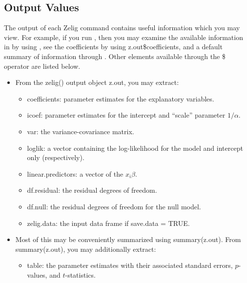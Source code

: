 \documentclass[letterpaper,10pt,english]{sphinxmanual}
\begin{document}
\subsection{Output Values}
\label{vignette:id74}
The output of each Zelig command contains useful information which you
may view. For example, if you run
, then you may examine
the available information in  by using , see
the coefficients by using z.out\$coefficients, and a default summary of
information through . Other elements available through
the \$ operator are listed below.
\begin{itemize}
\item {} 
From the zelig() output object z.out, you may extract:
\begin{itemize}
\item {} 
coefficients: parameter estimates for the explanatory variables.

\item {} 
icoef: parameter estimates for the intercept and “scale” parameter
\(1 / \alpha\).

\item {} 
var: the variance-covariance matrix.

\item {} 
loglik: a vector containing the log-likelihood for the model and
intercept only (respectively).

\item {} 
linear.predictors: a vector of the \(x_{i}\beta\).

\item {} 
df.residual: the residual degrees of freedom.

\item {} 
df.null: the residual degrees of freedom for the null model.

\item {} 
zelig.data: the input data frame if save.data = TRUE.

\end{itemize}

\item {} 
Most of this may be conveniently summarized using summary(z.out).
From summary(z.out), you may additionally extract:
\begin{itemize}
\item {} 
table: the parameter estimates with their associated standard
errors, \(p\)-values, and \(t\)-statistics.


\end{itemize}
\end{itemize}
\end{document}
